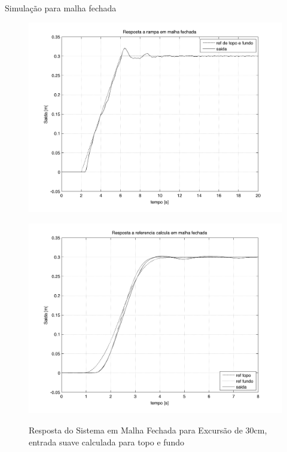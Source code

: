 \documentclass[10pt]{beamer}
\begin{document}
\begin{frame}[fragile]{Simulação para malha fechada}
\begin{figure}[!htb]
    \centering
    \begin{minipage}{.49\textwidth}
        \centering
       
        \includegraphics[width=1\linewidth]{figures/resultados/simulacao/respostaMalhaFechadaRampa}
        \label{respostaMalhaFechadaRampa}
         \caption{Resposta do Sistema em Malha Fechada para Excursão de 30cm, entrada rampa}
    \end{minipage}%
    \hspace{0.1cm}
    \begin{minipage}{0.49\textwidth}
        \centering
      
        \includegraphics[width=1\linewidth]{figures/resultados/simulacao/respostaMalhaFechadaRefTopoFundo}
        \label{respostaMalhaFechadaRefTopoFundo}
        \caption{Resposta do Sistema em Malha Fechada para Excursão de 30cm, entrada suave calculada para topo e fundo}
    \end{minipage}
\end{figure}
	
\end{frame}
\end{document}
